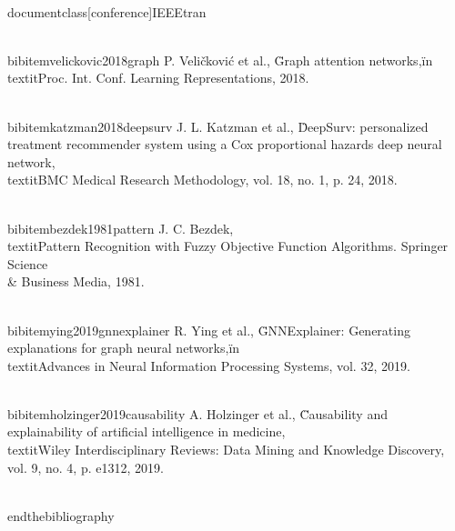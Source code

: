 \\documentclass[conference]{IEEEtran}
\begin{document}
\\bibitem{velickovic2018graph}
P. Veličković et al., \"Graph attention networks,\" in \\textit{Proc. Int. Conf. Learning Representations}, 2018.

\\bibitem{katzman2018deepsurv}
J. L. Katzman et al., \"DeepSurv: personalized treatment recommender system using a Cox proportional hazards deep neural network,\" \\textit{BMC Medical Research Methodology}, vol. 18, no. 1, p. 24, 2018.

\\bibitem{bezdek1981pattern}
J. C. Bezdek, \\textit{Pattern Recognition with Fuzzy Objective Function Algorithms}. Springer Science \\& Business Media, 1981.

\\bibitem{ying2019gnnexplainer}
R. Ying et al., \"GNNExplainer: Generating explanations for graph neural networks,\" in \\textit{Advances in Neural Information Processing Systems}, vol. 32, 2019.

\\bibitem{holzinger2019causability}
A. Holzinger et al., \"Causability and explainability of artificial intelligence in medicine,\" \\textit{Wiley Interdisciplinary Reviews: Data Mining and Knowledge Discovery}, vol. 9, no. 4, p. e1312, 2019.

\\end{thebibliography}

\
\end{document}
